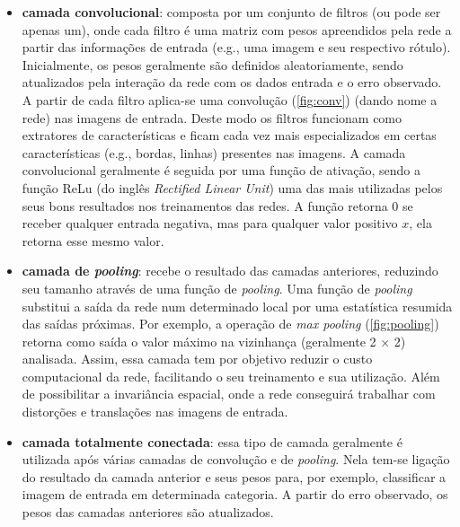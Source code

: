 \documentclass[12pt, a4paper, english, brazil]{article}
\begin{document}
\begin{itemize}

    \item \textbf{camada convolucional}: composta por um conjunto de filtros (ou pode ser apenas um), onde cada filtro é uma matriz com pesos apreendidos pela rede a partir das informações de entrada (e.g., uma imagem e seu respectivo rótulo). Inicialmente, os pesos geralmente são definidos aleatoriamente, sendo atualizados pela interação da rede com os dados entrada e o erro observado. A partir de cada filtro aplica-se uma convolução (\autoref{fig:conv}) (dando nome a rede) nas imagens de entrada. Deste modo os filtros funcionam como extratores de características e ficam cada vez mais especializados em certas características (e.g., bordas, linhas) presentes nas imagens. A camada convolucional geralmente é seguida por uma função de ativação, sendo a função ReLu (do inglês \textit{Rectified Linear Unit}) uma das mais utilizadas pelos seus bons resultados nos treinamentos das redes. A função retorna 0 se receber qualquer entrada negativa, mas para qualquer valor positivo $x$, ela retorna esse mesmo valor. 

    \item \textbf{camada de \textit{pooling}}: recebe o resultado das camadas anteriores, reduzindo seu tamanho através de uma função de \textit{pooling}. Uma função de \textit{pooling} substitui a saída da rede num determinado local por uma estatística resumida das saídas próximas. Por exemplo, a operação de \textit{max pooling} (\autoref{fig:pooling}) retorna como saída o valor máximo na vizinhança (geralmente 2 $\times$ 2) analisada. Assim, essa camada tem por objetivo reduzir o custo computacional da rede, facilitando o seu treinamento e sua utilização. Além de possibilitar a invariância espacial, onde a rede conseguirá trabalhar com distorções e translações nas imagens de entrada.

    \item \textbf{camada totalmente conectada}: essa tipo de camada geralmente é utilizada após várias camadas de convolução e de \textit{pooling}. Nela tem-se ligação do resultado da camada anterior e seus pesos para, por exemplo, classificar a imagem de entrada em determinada categoria. A partir do erro observado, os pesos das camadas anteriores são atualizados.

\end{itemize}
\end{document}
